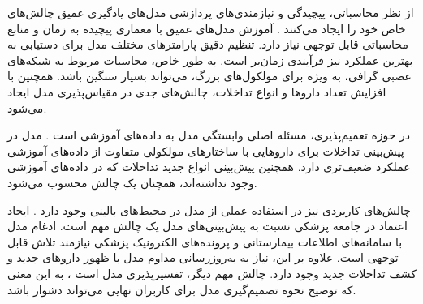 از نظر محاسباتی، پیچیدگی و نیازمندی‌های پردازشی مدل‌های یادگیری عمیق چالش‌های خاص خود را ایجاد می‌کنند \cite{ref_he2023}. آموزش مدل‌های عمیق با معماری پیچیده به زمان و منابع محاسباتی قابل توجهی نیاز دارد. تنظیم دقیق پارامترهای مختلف مدل برای دستیابی به بهترین عملکرد نیز فرآیندی زمان‌بر است. به طور خاص، محاسبات مربوط به شبکه‌های عصبی گرافی، به ویژه برای مولکول‌های بزرگ، می‌تواند بسیار سنگین باشد. همچنین با افزایش تعداد داروها و انواع تداخلات، چالش‌های جدی در مقیاس‌پذیری مدل ایجاد می‌شود.

در حوزه تعمیم‌پذیری، مسئله اصلی وابستگی مدل به داده‌های آموزشی است \cite{ref_dai2020}. مدل در پیش‌بینی تداخلات برای داروهایی با ساختارهای مولکولی متفاوت از داده‌های آموزشی عملکرد ضعیف‌تری دارد. همچنین پیش‌بینی انواع جدید تداخلات که در داده‌های آموزشی وجود نداشته‌اند، همچنان یک چالش محسوب می‌شود.

چالش‌های کاربردی نیز در استفاده عملی از مدل در محیط‌های بالینی وجود دارد \cite{ref_cascorbi2012}. ایجاد اعتماد در جامعه پزشکی نسبت به پیش‌بینی‌های مدل یک چالش مهم است. ادغام مدل با سامانه‌های اطلاعات بیمارستانی و پرونده‌های الکترونیک پزشکی نیازمند تلاش قابل توجهی است. علاوه بر این، نیاز به به‌روزرسانی مداوم مدل با ظهور داروهای جدید و کشف تداخلات جدید وجود دارد. چالش مهم دیگر، تفسیرپذیری مدل است \cite{ref_ryu2018}، به این معنی که توضیح نحوه تصمیم‌گیری مدل برای کاربران نهایی می‌تواند دشوار باشد.
